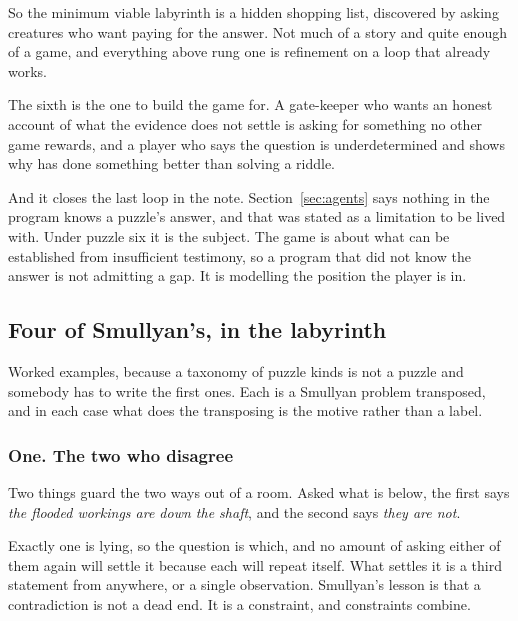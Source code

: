\documentclass[11pt,a4paper]{article}
\begin{document}
\begin{sectionbox}
So the minimum viable labyrinth is a hidden shopping list, discovered by asking creatures who want
paying for the answer. Not much of a story and quite enough of a game, and everything above rung
one is refinement on a loop that already works.
\end{sectionbox}

The sixth is the one to build the game for. A gate-keeper who wants an honest account of what the
evidence does not settle is asking for something no other game rewards, and a player who says the
question is underdetermined and shows why has done something better than solving a riddle.

\begin{sectionbox}
And it closes the last loop in the note. Section~\ref{sec:agents} says nothing in the program knows
a puzzle's answer, and that was stated as a limitation to be lived with. Under puzzle six it is
the subject. The game is about what can be established from insufficient testimony, so a program
that did not know the answer is not admitting a gap. It is modelling the position the player is in.
\end{sectionbox}

\subsection{Four of Smullyan's, in the labyrinth}
\label{sec:smullyanex}

Worked examples, because a taxonomy of puzzle kinds is not a puzzle and somebody has to write the
first ones. Each is a Smullyan problem transposed, and in each case what does the transposing is
the motive rather than a label.

\subsubsection*{One. The two who disagree}

Two things guard the two ways out of a room. Asked what is below, the first says \emph{the flooded
workings are down the shaft}, and the second says \emph{they are not}.

Exactly one is lying, so the question is which, and no amount of asking either of them again will
settle it because each will repeat itself. What settles it is a third statement from anywhere, or a
single observation. Smullyan's lesson is that a contradiction is not a dead end. It is a
constraint, and constraints combine.
\end{document}
